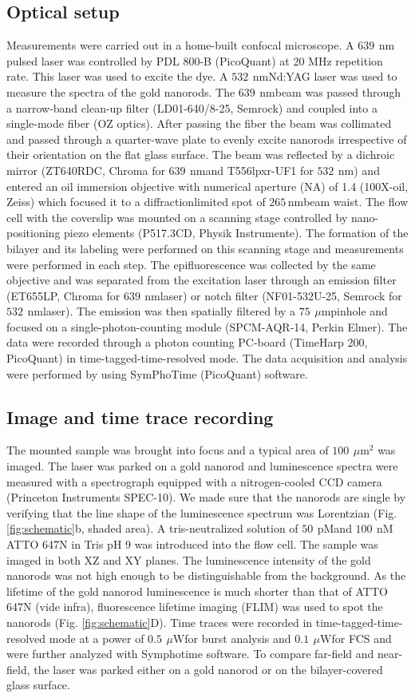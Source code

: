 \documentclass[journal=jacsat,manuscript=article]{achemso}
\newcommand{\uW}{\ensuremath{\,\mu\textrm{W}}}
\newcommand{\nm}{\ensuremath{\,\textrm{nm}}}
\newcommand{\um}{\ensuremath{\,\mu\textrm{m}}}
\newcommand{\nM}{\ensuremath{\,\textrm{nM}}}
\newcommand{\pM}{\ensuremath{\,\textrm{pM}}}
\begin{document}
\subsection{Optical setup}
Measurements were carried out in a home-built confocal microscope. A $639~$\nm pulsed laser was controlled by PDL 800-B (PicoQuant) at 20 MHz repetition rate. This laser was used to excite the dye. A $532~$\nm Nd:YAG laser was used to measure the spectra of the gold nanorods. The $639~$\nm beam was passed through a narrow-band clean-up filter (LD01-640/8-25, Semrock) and coupled into a single-mode fiber (OZ optics). After passing the fiber the beam was collimated and passed through a quarter-wave plate to evenly excite nanorods irrespective of their orientation on the flat glass surface. The beam was reflected by a dichroic mirror (ZT640RDC, Chroma for $639~$\nm and T556lpxr-UF1 for $532~$\nm) and entered an oil immersion objective with numerical aperture (NA) of 1.4 (100X-oil, Zeiss) which focused it to a diffractionlimited spot of $265$\nm beam waist. The flow cell with the coverslip was mounted on a scanning stage controlled by nano-positioning piezo elements (P517.3CD, Physik Instrumente). The formation of the bilayer and its labeling were performed on this scanning stage and measurements were performed in each step. The epifluorescence was collected by the same objective and was separated from the excitation laser through an emission filter (ET655LP, Chroma for $639~$\nm laser) or notch filter (NF01-532U-25, Semrock for $532~$\nm laser). The emission was then spatially filtered by a $75~$\um pinhole and focused on a single-photon-counting module (SPCM-AQR-14, Perkin Elmer). The data were recorded through a photon counting PC-board (TimeHarp 200, PicoQuant) in time-tagged-time-resolved mode. The data acquisition and analysis were performed by using SymPhoTime (PicoQuant) software.
\subsection{Image and time trace recording}
The mounted sample was brought into focus and a typical area of $100~\um^2$ was imaged. The laser was parked on a gold nanorod and luminescence spectra were measured with a spectrograph equipped with a nitrogen-cooled CCD camera (Princeton Instruments SPEC-10). We made sure that the nanorods are single by verifying that the line shape of the luminescence spectrum was Lorentzian (Fig. \ref{fig:schematic}b, shaded area). A tris-neutralized solution of $50~$\pM and $100~$\nM ATTO 647N in Tris pH 9 was introduced into the flow cell. The sample was imaged in both XZ and XY planes. The luminescence intensity of the gold nanorods was not high enough to be distinguishable from the background. As the lifetime of the gold nanorod luminescence is much shorter than that of ATTO 647N (vide infra), fluorescence lifetime imaging (FLIM) was used to spot the nanorods (Fig. \ref{fig:schematic}D). Time traces were recorded in time-tagged-time-resolved mode at a power of $0.5~$\uW for burst analysis and $0.1~$\uW for FCS and were further analyzed with Symphotime software. To compare far-field and near-field, the laser was parked either on a gold nanorod or on the bilayer-covered glass surface.
\end{document}
